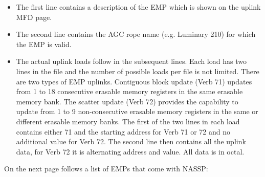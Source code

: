 \documentclass[11pt]{article} %
\begin{document}
\begin{itemize}
\item The first line contains a description of the EMP which is shown on the uplink MFD page.
\item The second line contains the AGC rope name (e.g. Luminary 210) for which the EMP is valid.
\item The actual uplink loads follow in the subsequent lines. Each load has two lines in the file and the number of possible loads per file is not limited. There are two types of EMP uplinks. Contiguous block update (Verb 71) updates from 1 to 18 consecutive erasable memory registers in the same erasable memory bank. The scatter update (Verb 72) provides the capability to update from 1 to 9 non-consecutive erasable memory registers in the same or different erasable memory banks. The first of the two lines in each load contains either 71 and the starting address for Verb 71 or 72 and no additional value for Verb 72. The second line then contains all the uplink data, for Verb 72 it is alternating address and value. All data is in octal.
\end{itemize}

On the next page follows a list of EMPs that come with NASSP:\\
\newpage
\end{document}
